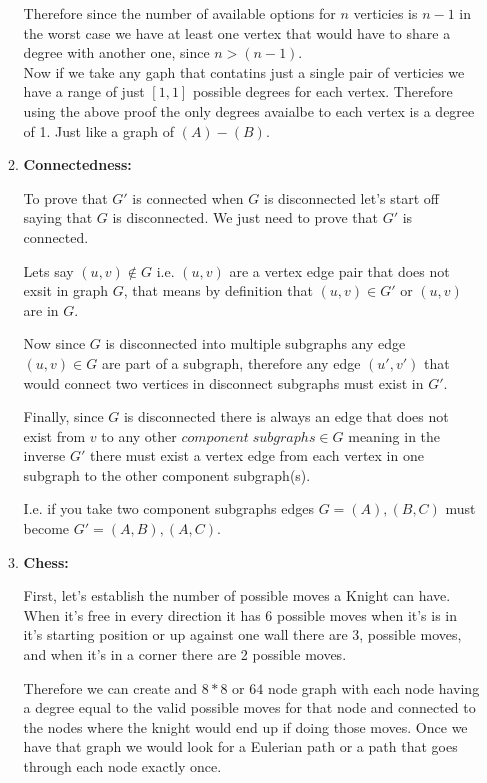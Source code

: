 \documentclass{article}
\begin{document}
\begin{enumerate}
\begin{enumerate}
        Therefore since the number of available options for $n$ verticies is $n - 1$ in the worst case we have at least one vertex that would have to share a degree with another one, since $n > (n - 1)$. \\
    
        Now if we take any gaph that contatins just a single pair of verticies we have a range of just $[1,1]$ possible degrees for each vertex. Therefore using the above proof the only degrees avaialbe to each vertex is a degree of 1. Just like a graph of $(A)-(B)$.

        \item \textbf{Connectedness:}
        
        To prove that $G'$ is connected when $G$ is disconnected let's start off saying that $G$ is disconnected. We just need to prove that $G'$ is connected.

        Lets say $(u, v) \notin G$ i.e. $(u, v)$ are a vertex edge pair that does not exsit in graph $G$, that means by definition that $(u, v) \in G'$ or $(u, v)$ are in $G$.
       
        Now since $G$ is disconnected into multiple subgraphs any edge $(u, v) \in G$ are part of a subgraph, therefore any edge $(u', v')$ that would connect two vertices in disconnect subgraphs must exist in $G'$.
       
        Finally, since $G$ is disconnected there is always an edge that does not exist from $v$ to any other $component\;subgraphs \in G$ meaning in the inverse $G'$ there must exist a vertex edge from each vertex in one subgraph to the other component subgraph(s).
       
        I.e. if you take two component subgraphs edges $G = {(A)}, {(B,C)}$ must become $G' = {(A,B),(A,C)}$.

        \item \textbf{Chess:}
        
        First, let's establish the number of possible moves a Knight can have. When it's free in every direction it has 6 possible moves when it's is in it's starting position or up against one wall there are 3, possible moves, and when it's in a corner there are 2 possible moves.

        Therefore we can create and $8*8$ or $64$ node graph with each node having a degree equal to the valid possible moves for that node and connected to the nodes where the knight would end up if doing those moves. Once we have that graph we would look for a Eulerian path or a path that goes through each node exactly once.
       

\end{enumerate}
\end{enumerate}
\end{document}
